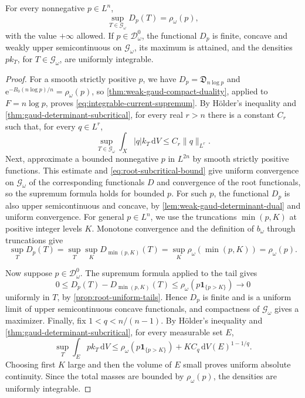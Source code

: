 \begin{theorem}\label{thm:integrable-current-attainment}
For every nonnegative $p\in L^n$,
\begin{equation}\label{eq:integrable-current-supremum}
 \sup_{T\in\mathscr G_\omega}D_p(T)=\rho_\omega(p),
\end{equation}
with the value $+\infty$ allowed. If $p\in\mathcal D_\omega^0$, the functional $D_p$ is finite, concave and weakly upper semicontinuous on $\mathscr G_\omega$, its maximum is attained, and the densities $p k_T$, for $T\in\mathscr G_\omega$, are uniformly integrable.
\end{theorem}
\begin{proof}
For a smooth strictly positive $p$, we have $D_p=\mathfrak D_{n\log p}$ and $\mathrm{e}^{-B_0(n\log p)/n}=\rho_\omega(p)$, so \cref{thm:weak-gaud-compact-duality}, applied to $F=n\log p$, proves \eqref{eq:integrable-current-supremum}. By H\"older's inequality and \cref{thm:gaud-determinant-subcritical}, for every real $r>n$ there is a constant $C_r$ such that, for every $q\in L^r$,
\begin{equation}\label{eq:current-root-test-bound}
 \sup_{T\in\mathscr G_\omega}\int_X|q| k_T\,\mathrm{d}V
       \leq C_r\|q\|_{L^r}.
\end{equation}
Next, approximate a bounded nonnegative $p$ in $L^{2n}$ by smooth strictly positive functions. This estimate and \eqref{eq:root-subcritical-bound} give uniform convergence on $\mathscr G_\omega$ of the corresponding functionals $D$ and convergence of the root functionals, so the supremum formula holds for bounded $p$. For such $p$, the functional $D_p$ is also upper semicontinuous and concave, by \cref{lem:weak-gaud-determinant-dual} and uniform convergence. For general $p\in L^n$, we use the truncations $\min(p,K)$ at positive integer levels $K$. Monotone convergence and the definition of $b_\omega$ through truncations give
\[
 \sup_T D_p(T)=\sup_T\sup_K D_{\min(p,K)}(T)
       =\sup_K\rho_\omega(\min(p,K))=\rho_\omega(p).
\]

Now suppose $p\in\mathcal D_\omega^0$. The supremum formula applied to the tail gives
\[
 0\leq D_p(T)-D_{\min(p,K)}(T)
 \leq \rho_\omega(p\mathbf1_{\{p>K\}})\longrightarrow0
\]
uniformly in $T$, by \cref{prop:root-uniform-tails}. Hence $D_p$ is finite and is a uniform limit of upper semicontinuous concave functionals, and compactness of $\mathscr G_\omega$ gives a maximizer. Finally, fix $1<q<n/(n-1)$. By H\"older's inequality and \cref{thm:gaud-determinant-subcritical}, for every measurable set $E$,
\[
 \sup_T\int_Ep k_T\,\mathrm{d}V
 \leq\rho_\omega(p\mathbf1_{\{p>K\}})
       +K C_q\,\mathrm{d}V(E)^{1-1/q}.
\]
Choosing first $K$ large and then the volume of $E$ small proves uniform absolute continuity. Since the total masses are bounded by $\rho_\omega(p)$, the densities are uniformly integrable.
\end{proof}

